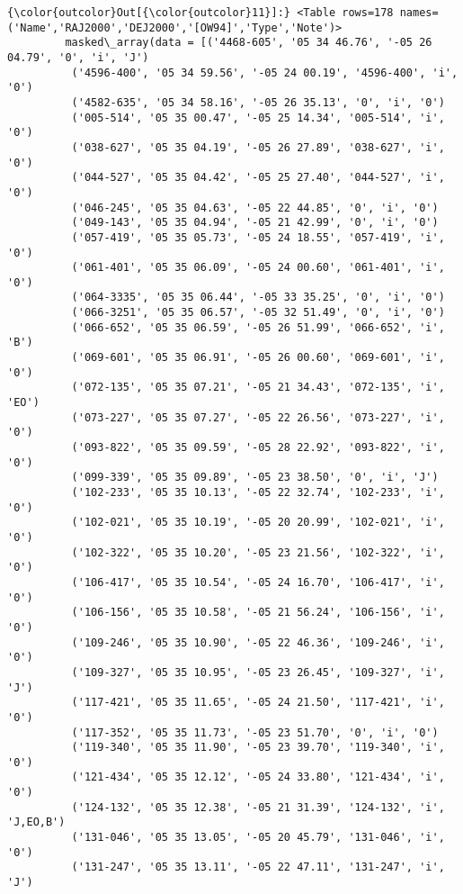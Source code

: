 \documentclass{article}
\begin{document}
            \begin{Verbatim}[commandchars=\\\{\}]
{\color{outcolor}Out[{\color{outcolor}11}]:} <Table rows=178 names=('Name','RAJ2000','DEJ2000','[OW94]','Type','Note')>
         masked\_array(data = [('4468-605', '05 34 46.76', '-05 26 04.79', '0', 'i', 'J')
          ('4596-400', '05 34 59.56', '-05 24 00.19', '4596-400', 'i', '0')
          ('4582-635', '05 34 58.16', '-05 26 35.13', '0', 'i', '0')
          ('005-514', '05 35 00.47', '-05 25 14.34', '005-514', 'i', '0')
          ('038-627', '05 35 04.19', '-05 26 27.89', '038-627', 'i', '0')
          ('044-527', '05 35 04.42', '-05 25 27.40', '044-527', 'i', '0')
          ('046-245', '05 35 04.63', '-05 22 44.85', '0', 'i', '0')
          ('049-143', '05 35 04.94', '-05 21 42.99', '0', 'i', '0')
          ('057-419', '05 35 05.73', '-05 24 18.55', '057-419', 'i', '0')
          ('061-401', '05 35 06.09', '-05 24 00.60', '061-401', 'i', '0')
          ('064-3335', '05 35 06.44', '-05 33 35.25', '0', 'i', '0')
          ('066-3251', '05 35 06.57', '-05 32 51.49', '0', 'i', '0')
          ('066-652', '05 35 06.59', '-05 26 51.99', '066-652', 'i', 'B')
          ('069-601', '05 35 06.91', '-05 26 00.60', '069-601', 'i', '0')
          ('072-135', '05 35 07.21', '-05 21 34.43', '072-135', 'i', 'EO')
          ('073-227', '05 35 07.27', '-05 22 26.56', '073-227', 'i', '0')
          ('093-822', '05 35 09.59', '-05 28 22.92', '093-822', 'i', '0')
          ('099-339', '05 35 09.89', '-05 23 38.50', '0', 'i', 'J')
          ('102-233', '05 35 10.13', '-05 22 32.74', '102-233', 'i', '0')
          ('102-021', '05 35 10.19', '-05 20 20.99', '102-021', 'i', '0')
          ('102-322', '05 35 10.20', '-05 23 21.56', '102-322', 'i', '0')
          ('106-417', '05 35 10.54', '-05 24 16.70', '106-417', 'i', '0')
          ('106-156', '05 35 10.58', '-05 21 56.24', '106-156', 'i', '0')
          ('109-246', '05 35 10.90', '-05 22 46.36', '109-246', 'i', '0')
          ('109-327', '05 35 10.95', '-05 23 26.45', '109-327', 'i', 'J')
          ('117-421', '05 35 11.65', '-05 24 21.50', '117-421', 'i', '0')
          ('117-352', '05 35 11.73', '-05 23 51.70', '0', 'i', '0')
          ('119-340', '05 35 11.90', '-05 23 39.70', '119-340', 'i', '0')
          ('121-434', '05 35 12.12', '-05 24 33.80', '121-434', 'i', '0')
          ('124-132', '05 35 12.38', '-05 21 31.39', '124-132', 'i', 'J,EO,B')
          ('131-046', '05 35 13.05', '-05 20 45.79', '131-046', 'i', '0')
          ('131-247', '05 35 13.11', '-05 22 47.11', '131-247', 'i', 'J')

\end{Verbatim}
\end{document}
